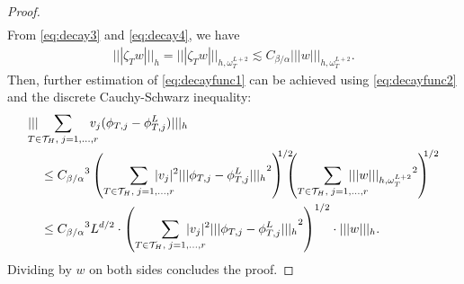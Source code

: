 \documentclass[10pt]{article}
\numberwithin{equation}{section}
\theoremstyle{plain}
\theoremstyle{definition}
\theoremstyle{remark}
\begin{document}
\begin{proof}
\begin{equation}
\begin{aligned}
    \end{aligned}
  \end{equation}
  From \eqref{eq:decay3} and \eqref{eq:decay4}, we have
  \begin{equation}\label{eq:decayfunc2}
    \begin{aligned}
      {||| {\zeta_T w} |||_h}={||| {\zeta_T w} |||_{h,{\omega^{L+2}_T}}}\lesssim {C_{{\beta}/{\alpha}}}{||| { w} |||_{h,{\omega^{L+2}_T}}}.
    \end{aligned}
  \end{equation}
  Then, further estimation of \eqref{eq:decayfunc1} can be achieved using \eqref{eq:decayfunc2} and the discrete Cauchy-Schwarz inequality:
  \begin{equation}\notag
    \begin{aligned}
      &{||| {\hspace{-2ex}\sum_{T\in{\mathcal{T}}_H,\;j=1,\ldots,r}\hspace{-2ex}v_j(\phi_{T,j}-\phi^L_{T,j})} |||_h}  \\
      & \quad\leq  {C_{{\beta}/{\alpha}}}^3\left(\hspace{-0ex}\sum_{T\in{\mathcal{T}}_H,\;j=1,\ldots,r}\hspace{-4ex}|v_j|^2{||| {\phi_{T,j}-\phi^L_{T,j}} |||_h}^2\right)^{\hspace{-1ex}1/2}\hspace{-1.7ex}\left(\hspace{-0ex}\sum_{T\in{\mathcal{T}}_H,\;j=1,\ldots,r}\hspace{-4ex}{||| {w} |||_{h,{\omega^{L+2}_T}}}^2\right)^{\hspace{-1ex}1/2} \\
      & \quad\leq  {C_{{\beta}/{\alpha}}}^3L^{d/2} \cdot\left(\hspace{-0ex}\sum_{T\in{\mathcal{T}}_H,\;j=1,\ldots,r}\hspace{-4ex}|v_j|^2{||| {\phi_{T,j}-\phi^L_{T,j}} |||_h}^2\right)^{1/2}\cdot{||| { w} |||_h}.
    \end{aligned}
  \end{equation}
Dividing by $w$ on both sides concludes the proof.
\end{proof}
\end{document}
